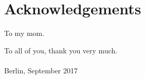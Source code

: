 \documentclass[11pt, english, singlespacing, headsepline, ]{MastersDoctoralThesis}
\theoremstyle{definition}
\begin{document}
\chapter*{Acknowledgements}\pagestyle{empty}
To my mom.

To all of you, thank you very much.
\\
\\

Berlin, September 2017 



\pagestyle{empty} 
\tableofcontents%












\end{document}
